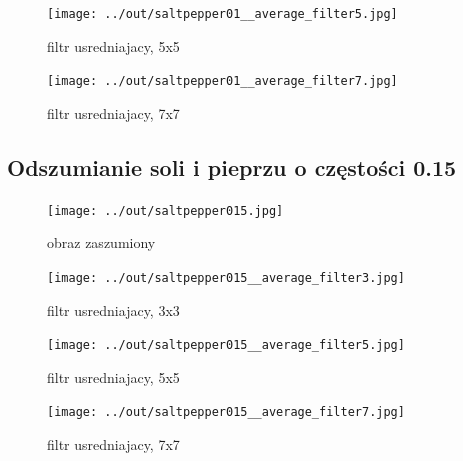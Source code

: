 \documentclass[a4paper,12pt]{article}
\begin{document}
\begin{figure}[h!]
\begin{minipage}[t]{7.5cm}
\begin{center}
\texttt{[image: ../out/saltpepper01\_\_average\_filter5.jpg]}
\caption{filtr usredniajacy, 5x5}
\end{center}
\end{minipage}
\hfill
\begin{minipage}[t]{7.5cm}
\begin{center}
\texttt{[image: ../out/saltpepper01\_\_average\_filter7.jpg]}
\caption{filtr usredniajacy, 7x7}
\end{center}
\end{minipage}
\end{figure}


\newpage
\subsection{Odszumianie soli i pieprzu o częstości 0.15}
\begin{figure}[h!]
\begin{minipage}[t]{7.5cm}
\begin{center}
\texttt{[image: ../out/saltpepper015.jpg]}
\caption{obraz zaszumiony}
\end{center}
\end{minipage}
\hfill
\begin{minipage}[t]{7.5cm}
\begin{center}
\texttt{[image: ../out/saltpepper015\_\_average\_filter3.jpg]}
\caption{filtr usredniajacy, 3x3}
\end{center}
\end{minipage}
\end{figure}

\begin{figure}[h!]
\begin{minipage}[t]{7.5cm}
\begin{center}
\texttt{[image: ../out/saltpepper015\_\_average\_filter5.jpg]}
\caption{filtr usredniajacy, 5x5}
\end{center}
\end{minipage}
\hfill
\begin{minipage}[t]{7.5cm}
\begin{center}
\texttt{[image: ../out/saltpepper015\_\_average\_filter7.jpg]}
\caption{filtr usredniajacy, 7x7}
\end{center}
\end{minipage}
\end{figure}
\end{document}
